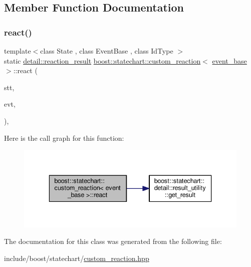\subsection{Member Function Documentation}
\mbox{\label{classboost_1_1statechart_1_1custom__reaction_3_01event__base_01_4_a176761fd7d64c28e85d3df80c49f016f}} 
\subsubsection{\texorpdfstring{react()}{react()}}
{\footnotesize\ttfamily template$<$class State , class Event\+Base , class Id\+Type $>$ \\
static \mbox{\hyperlink{namespaceboost_1_1statechart_1_1detail_ab091bbb4c29327fb46ee479ea1b7255b}{detail\+::reaction\+\_\+result}} \mbox{\hyperlink{classboost_1_1statechart_1_1custom__reaction}{boost\+::statechart\+::custom\+\_\+reaction}}$<$ \mbox{\hyperlink{classboost_1_1statechart_1_1event__base}{event\+\_\+base}} $>$\+::react (\begin{DoxyParamCaption}\item[{State \&}]{stt,  }\item[{const Event\+Base \&}]{evt,  }\item[{const Id\+Type \&}]{ }\end{DoxyParamCaption})\hspace{0.3cm}{\ttfamily [inline]}, {\ttfamily [static]}}

Here is the call graph for this function\+:
\nopagebreak
\begin{figure}[H]
\begin{center}
\leavevmode
\includegraphics[width=336pt]{classboost_1_1statechart_1_1custom__reaction_3_01event__base_01_4_a176761fd7d64c28e85d3df80c49f016f_cgraph}
\end{center}
\end{figure}


The documentation for this class was generated from the following file\+:\begin{DoxyCompactItemize}
\item 
include/boost/statechart/\mbox{\hyperlink{custom__reaction_8hpp}{custom\+\_\+reaction.\+hpp}}\end{DoxyCompactItemize}
